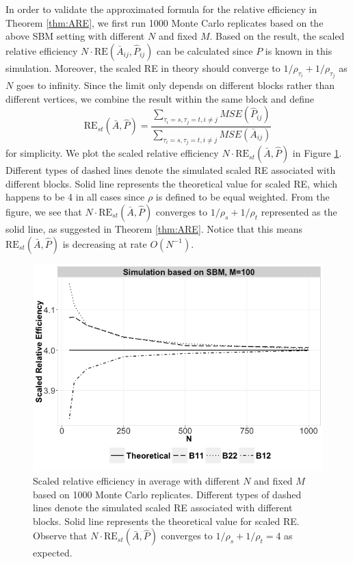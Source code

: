 \documentclass[a4paper]{article}
\begin{document}
In order to validate the approximated formula for the relative efficiency in Theorem \ref{thm:ARE}, we first run 1000 Monte Carlo replicates based on the above SBM setting with different $N$ and fixed $M$. Based on the result, the scaled relative efficiency $N \cdot \mathrm{RE}(\bar{A}_{ij}, \hat{P}_{ij})$ can be calculated since $P$ is known in this simulation. Moreover, the scaled RE in theory should converge to $1/\rho_{\tau_i}+1/\rho_{\tau_j}$ as $N$ goes to infinity. Since the limit only depends on different blocks rather than different vertices, we combine the result within the same block and define
\[
	\mathrm{RE}_{st}(\bar{A},\hat{P}) = \frac{\sum_{\tau_i=s,\tau_j=t,i \ne j} MSE(\hat{P}_{ij})}{\sum_{\tau_i=s,\tau_j=t,i \ne j} MSE(\bar{A}_{ij})}
\]
for simplicity.
We plot the scaled relative efficiency $N \cdot \mathrm{RE}_{st}(\bar{A},\hat{P})$ in Figure \ref{fig:RE}. Different types of dashed lines denote the simulated scaled RE associated with different blocks. Solid line represents the theoretical value for scaled RE, which happens to be 4 in all cases since $\rho$ is defined to be equal weighted. From the figure, we see that $N \cdot \mathrm{RE}_{st}(\bar{A}, \hat{P})$ converges to $1/\rho_s + 1/\rho_t$ represented as the solid line, as suggested in Theorem \ref{thm:ARE}. Notice that this means $\mathrm{RE}_{st}(\bar{A}, \hat{P})$ is decreasing at rate $O(N^{-1})$.

\begin{figure}[!htb]
	\centering
	\includegraphics[width=1\textwidth]{RE.png}
	\caption{Scaled relative efficiency in average with different $N$ and fixed $M$ based on 1000 Monte Carlo replicates. Different types of dashed lines denote the simulated scaled RE associated with different blocks. Solid line represents the theoretical value for scaled RE. Observe that $N \cdot \mathrm{RE}_{st}(\bar{A}, \hat{P})$ converges to $1/\rho_s + 1/\rho_t = 4$ as expected.}
	\label{fig:RE}
\end{figure}
\end{document}
